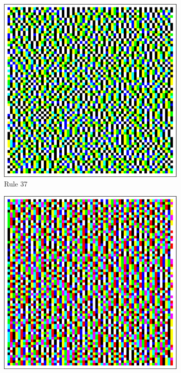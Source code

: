 \documentclass{article}
\begin{document}
\begin{figure}[H]
    \centering
    \begin{subfigure}[b]{0.135\textwidth}
        \centering
        \includegraphics[width=\textwidth]{graphics/behavior/center-columns/rule-37-center_columns-4096.pdf}
        \vspace{-16pt}\caption*{Rule 37}
        \label{fig:rule-37-center_columns-4096}
    \end{subfigure}
    \begin{subfigure}[b]{0.135\textwidth}
        \centering
        \includegraphics[width=\textwidth]{graphics/behavior/center-columns/rule-45-center_columns-4096.pdf}

\end{subfigure}
\end{figure}
\end{document}
